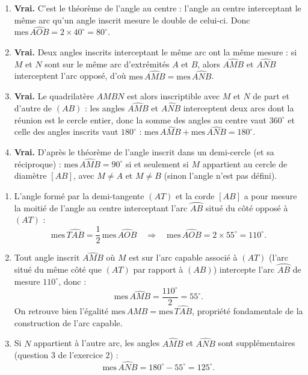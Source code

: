\documentclass[11pt]{article}
\begin{document}
\begin{corrige}
\begin{enumerate}
\item \textbf{Vrai.} C'est le théorème de l'angle au centre : l'angle au centre interceptant le même arc qu'un angle inscrit mesure le double de celui-ci. Donc $\mathrm{mes}\,\widehat{AOB} = 2 \times 40^{\circ} = 80^{\circ}$.
\item \textbf{Vrai.} Deux angles inscrits interceptant le même arc ont la même mesure : si $M$ et $N$ sont sur le même arc d'extrémités $A$ et $B$, alors $\widehat{AMB}$ et $\widehat{ANB}$ interceptent l'arc opposé, d'où $\mathrm{mes}\,\widehat{AMB} = \mathrm{mes}\,\widehat{ANB}$.
\item \textbf{Vrai.} Le quadrilatère $AMBN$ est alors inscriptible avec $M$ et $N$ de part et d'autre de $(AB)$ : les angles $\widehat{AMB}$ et $\widehat{ANB}$ interceptent deux arcs dont la réunion est le cercle entier, donc la somme des angles au centre vaut $360^{\circ}$ et celle des angles inscrits vaut $180^{\circ}$ : $\mathrm{mes}\,\widehat{AMB} + \mathrm{mes}\,\widehat{ANB} = 180^{\circ}$.
\item \textbf{Vrai.} D'après le théorème de l'angle inscrit dans un demi-cercle (et sa réciproque) : $\mathrm{mes}\,\widehat{AMB} = 90^{\circ}$ si et seulement si $M$ appartient au cercle de diamètre $[AB]$, avec $M \neq A$ et $M \neq B$ (sinon l'angle n'est pas défini).
\end{enumerate}
\end{corrige}

\begin{corrige}
\begin{enumerate}
\item L'angle formé par la demi-tangente $(AT)$ et la corde $[AB]$ a pour mesure la moitié de l'angle au centre interceptant l'arc $\wideparen{AB}$ situé du côté opposé à $(AT)$ :
\[ \mathrm{mes}\,\widehat{TAB} = \frac{1}{2}\,\mathrm{mes}\,\widehat{AOB} \quad\Longrightarrow\quad \mathrm{mes}\,\widehat{AOB} = 2 \times 55^{\circ} = 110^{\circ}. \]
\item Tout angle inscrit $\widehat{AMB}$ où $M$ est sur l'arc capable associé à $(AT)$ (l'arc situé du même côté que $(AT)$ par rapport à $(AB)$) intercepte l'arc $\wideparen{AB}$ de mesure $110^{\circ}$, donc :
\[ \mathrm{mes}\,\widehat{AMB} = \frac{110^{\circ}}{2} = 55^{\circ}. \]
On retrouve bien l'égalité $\mathrm{mes}\,\widehat{AMB} = \mathrm{mes}\,\widehat{TAB}$, propriété fondamentale de la construction de l'arc capable.
\item Si $N$ appartient à l'autre arc, les angles $\widehat{AMB}$ et $\widehat{ANB}$ sont supplémentaires (question 3 de l'exercice 2) :
\[ \mathrm{mes}\,\widehat{ANB} = 180^{\circ} - 55^{\circ} = 125^{\circ}. \]
\end{enumerate}
\end{corrige}
\end{document}

